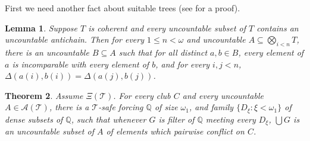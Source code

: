 \documentclass[a4paper,noamsfonts]{amsart}
\newtheorem{theorem}{Theorem}[section]
\newtheorem{lemma}[theorem]{Lemma}
\theoremstyle{definition}
\newcommand{\Q}{\mathbb{Q}}
\newcommand{\seb}{\subseteq}
\newcommand{\1}{\mathbf{1}}
\newcommand{\T}{\mathcal{T}}
\newcommand{\prop}{\Xi}
\begin{document}
First we need another fact about suitable trees
(see \cite{TodorcevicWalks} for a proof).

\begin{lemma}\label{lem:tuples}
  Suppose $T$ is coherent and every uncountable subset of $T$
  contains an uncountable antichain. Then for every $1 \le n < \omega$
  and uncountable $A \seb \bigotimes_{i < n}T$, 
  there is an uncountable $B \seb A$
  such that for all distinct $a,b \in B$, every element
  of $a$ is incomparable with every element of $b$, and for every
  $i,j < n$, $\Delta(a(i),b(i)) = \Delta(a(j),b(j))$.
\end{lemma}

\begin{theorem}\label{thm:crux}
  Assume $\prop(\T)$. For every club $C$
  and every uncountable $A \in \mathcal{A}(\T)$,
  there is a $\T$-safe forcing $\Q$ of
  size $\omega_{1}$, and family
  $\{D_{\xi} : \xi < \omega_{1}\}$ of dense subsets of $\Q$,
  such that whenever $G$ is filter of $\Q$ meeting every
  $D_{\xi}$, $\bigcup G$ is an uncountable subset of $A$ of elements which
  pairwise conflict on $C$.
\end{theorem}
\end{document}
